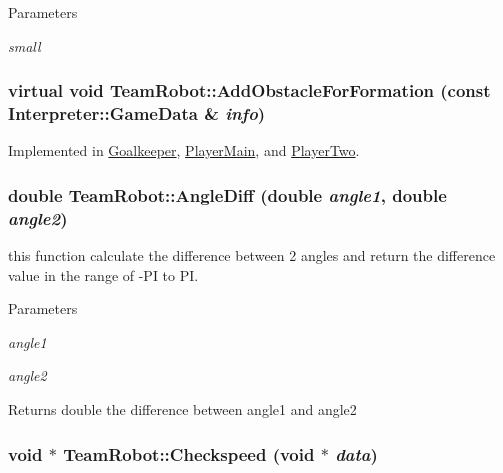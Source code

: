 \begin{DoxyParams}{Parameters}
\item[{\em small}]\end{DoxyParams}
\hypertarget{classTeamRobot_a71ec65db46db1ac511fe17b668d4f192}{
\subsubsection[{AddObstacleForFormation}]{\setlength{\rightskip}{0pt plus 5cm}virtual void TeamRobot::AddObstacleForFormation (const {\bf Interpreter::GameData} \& {\em info})}}
\label{classTeamRobot_a71ec65db46db1ac511fe17b668d4f192}


Implemented in \hyperlink{classGoalkeeper_a5287a2e74795bbec8f0ead767655da5d}{Goalkeeper}, \hyperlink{classPlayerMain_a978b3ce16f5d8e5d1cb9ef70f387227e}{PlayerMain}, and \hyperlink{classPlayerTwo_a9e3341541658f54a2dfb0491a774b4d4}{PlayerTwo}.

\hypertarget{classTeamRobot_a45d5d631b1e1e28c9c0f4ecbd47fdbde}{
\subsubsection[{AngleDiff}]{\setlength{\rightskip}{0pt plus 5cm}double TeamRobot::AngleDiff (double {\em angle1}, \/  double {\em angle2})}}
\label{classTeamRobot_a45d5d631b1e1e28c9c0f4ecbd47fdbde}


this function calculate the difference between 2 angles and return the difference value in the range of -\/PI to PI. 


\begin{DoxyParams}{Parameters}
\item[{\em angle1}]\item[{\em angle2}]\end{DoxyParams}
\begin{DoxyReturn}{Returns}
double the difference between angle1 and angle2 
\end{DoxyReturn}
\hypertarget{classTeamRobot_ac52f7f240fde40db09116e8639a53c21}{
\subsubsection[{Checkspeed}]{\setlength{\rightskip}{0pt plus 5cm}void $\ast$ TeamRobot::Checkspeed (void $\ast$ {\em data})}}
\label{classTeamRobot_ac52f7f240fde40db09116e8639a53c21}


